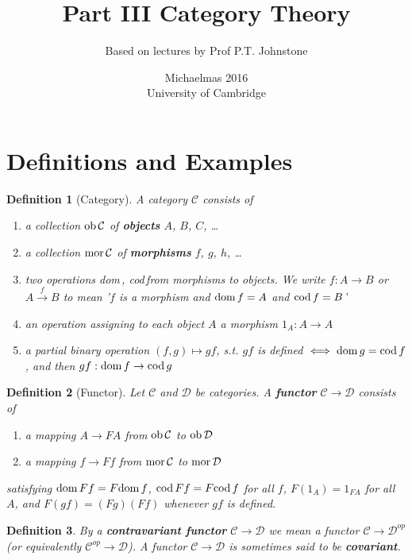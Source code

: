 \documentclass[a4paper]{article}
\title{Part III Category Theory}
\author{Based on lectures by Prof P.T. Johnstone}
\date{Michaelmas 2016\\University of Cambridge}
\newtheorem*{definition}{Definition}
\newcommand*\dom[1]{\textnormal{dom}\,#1}
\newcommand*\cod[1]{\textnormal{cod}\,#1}
\newcommand*\ob[1]{\textnormal{ob}\,#1}
\newcommand*\mor[1]{\textnormal{mor}\,#1}
\begin{document}
\maketitle
\tableofcontents

\section{Definitions and Examples}
\begin{definition}[Category]
	A category $\mathcal{C}$ consists of 
	\begin{enumerate}[label=\alph*.]
		\item a collection $\ob{\mathcal{C}}$ of \textbf{objects} $A$, $B$, $C$, \dots
		\item a collection $\mor{\mathcal{C}}$ of \textbf{morphisms} $f$, $g$, $h$, \dots
		\item two operations \dom, \cod from morphisms to objects. We write $f:A\to B$ or $A\overset{f}{\to}B$ to mean '$f$ is a morphism and $\dom{f}=A$ and $\cod{f}=B$'
		\item an operation assigning to each object $A$ a morphism $1_A:A\to A$
		\item a partial binary operation $(f, g) \mapsto gf$, s.t. $gf$ is defined $\iff \dom{g}=\cod{f}$, and then $gf:\dom{f}\to\cod{g}$
	\end{enumerate}
\end{definition}

\begin{definition}[Functor]
	Let $\mathcal{C}$ and $\mathcal{D}$ be categories. A \textbf{functor} $\mathcal{C}\to\mathcal{D}$ consists of
	\begin{enumerate}[label=\alph*.]
		\item a mapping $A \to FA$ from $\ob{\mathcal{C}}$ to $\ob{\mathcal{D}}$
		\item a mapping $f \to Ff$ from $\mor{\mathcal{C}}$ to $\mor{\mathcal{D}}$
	\end{enumerate}
	satisfying $\dom{Ff}=F\dom{f}$, $\cod{Ff}=F\cod{f}$ for all $f$, $F(1_A)=1_{FA}$ for all $A$, and $F(gf)=(Fg)(Ff)$ whenever $gf$ is defined.
\end{definition}

\begin{definition}
	By a \textbf{contravariant functor} $\mathcal{C} \to \mathcal{D}$ we mean a functor $\mathcal{C} \to \mathcal{D}^{op}$ (or equivalently $\mathcal{C}^{op} \to \mathcal{D}$). A functor $\mathcal{C} \to \mathcal{D}$ is sometimes said to be \textbf{covariant}.
\end{definition}
\end{document}
